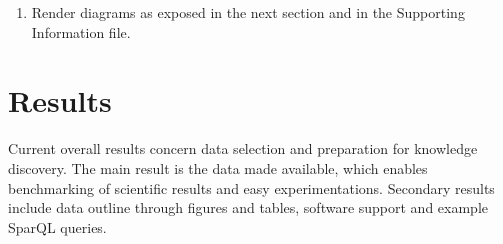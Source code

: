\documentclass[review]{elsarticle}
\newcommand{\textttt}[1] {\texttt{\footnotesize#1}}
\begin{document}
\begin{enumerate}[leftmargin=0cm]
\item Render diagrams as exposed in the next section and in the Supporting Information file.
\end{enumerate}
 
\section{Results}
\label{outline}
Current overall results concern data selection and preparation for knowledge discovery.
The main result is the data made available, which enables benchmarking of scientific results
and easy experimentations.
Secondary results include data outline through figures and tables,
software support and example SparQL queries.
\end{document}
